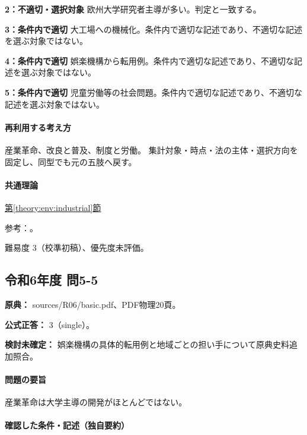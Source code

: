 \noindent\textbf{2：不適切・選択対象} 欧州大学研究者主導が多い。判定と一致する。\par

\noindent\textbf{3：条件内で適切} 大工場への機械化。条件内で適切な記述であり、不適切な記述を選ぶ対象ではない。\par

\noindent\textbf{4：条件内で適切} 娯楽機構から転用例。条件内で適切な記述であり、不適切な記述を選ぶ対象ではない。\par

\noindent\textbf{5：条件内で適切} 児童労働等の社会問題。条件内で適切な記述であり、不適切な記述を選ぶ対象ではない。\par

\paragraph{再利用する考え方} 産業革命、改良と普及、制度と労働。 集計対象・時点・法の主体・選択方向を固定し、同型でも元の五肢へ戻す。

\paragraph{共通理論} \hyperref[theory:env:industrial]{第\ref*{theory:env:industrial}節}

\par 参考：\cite{env58_steam}。

\par 難易度 3（校準初稿）、優先度未評価。

\subsection{令和6年度 問5-5}
\label{q:r06-reg-basic-5-5}

\noindent\textbf{原典：} sources/R06/basic.pdf、PDF物理20頁。

\textbf{公式正答：} 3（single）。

\par\textbf{検討未確定：} 娯楽機構の具体的転用例と地域ごとの担い手について原典史料追加照合。

\paragraph{問題の要旨} 産業革命は大学主導の開発がほとんどではない。

\paragraph{確認した条件・記述（独自要約）}\mbox{}\par

